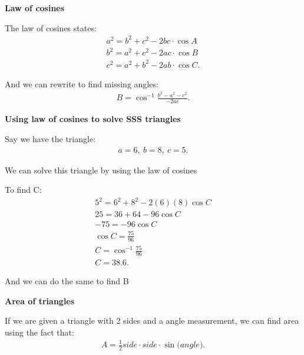 \documentclass{report}
\begin{document}
  \bigbreak \noindent \bigbreak \noindent 
  \begin{large}
    \textbf{Law of cosines}
  \end{large}
  \bigbreak \noindent \bigbreak \noindent
  The law of cosines states:
  \begin{align*}
    a^{2} = b^{2} + c^{2} -2bc \cdot \cos{A} \\
    b^{2} = a^{2} + c^{2} -2ac \cdot \cos{B} \\
    c^{2} = a^{2} + b^{2} -2ab \cdot \cos{C}
  .\end{align*}

  \bigbreak \noindent \bigbreak \noindent
  And we can rewrite to find missing angles:
  \begin{align*}
    B = \cos^{-1}{\frac{b^{2}- a^{2}-c^{2}}{-2ac}}
  .\end{align*}

  \bigbreak \noindent \bigbreak \noindent 
  \begin{large}
    \textbf{Using law of cosines to solve SSS triangles}
  \end{large}

  \bigbreak \noindent \bigbreak \noindent
  Say we have the triangle:
  \begin{align*}
    a=6,\ b=8,\ c=5
  .\end{align*}

\begin{figure}[ht]
    \centering
    \label{fig:tri3}
\end{figure}

  \bigbreak \noindent \bigbreak \noindent
  We can solve this triangle by using the law of cosines

  \bigbreak \noindent \bigbreak \noindent
  To find C:
  \begin{align*}
    5^{2} = 6^{2} + 8^{2} - 2(6)(8)\cos{C} \\
    25 = 36 + 64 -96\cos{C} \\
    -75 = -96\cos{C} \\
    \cos{C} = \frac{75}{96} \\
    C = \cos^{-1}{\frac{75}{96}} \\
    C = 38.6
  .\end{align*}

  \bigbreak \noindent \bigbreak \noindent
  And we can do the same to find B

  \bigbreak \noindent \bigbreak \noindent 
  \begin{Large}
    \textbf{Area of triangles}
  \end{Large}
  \bigbreak \noindent \bigbreak \noindent
  If we are given a triangle with 2 sides and a angle measurement, we can find area using the fact that:
  \begin{align*}
    A = \frac{1}{2}\textit{side} \cdot \textit{side} \cdot \sin{(\textit{angle}})
  .\end{align*}
\end{document}
